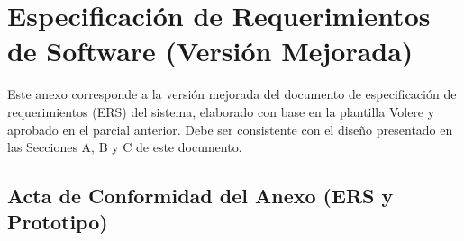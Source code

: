 
\chapter{Especificación de Requerimientos de Software (Versión Mejorada)}
\label{anexo:ers}

\noindent Este anexo corresponde a la versión mejorada del documento de especificación de requerimientos (ERS) del sistema, elaborado con base en la plantilla Volere \cite{ref23} y aprobado en el parcial anterior. Debe ser consistente con el diseño presentado en las Secciones A, B y C de este documento.

\clearpage




\section{Acta de Conformidad del Anexo (ERS y Prototipo)}
